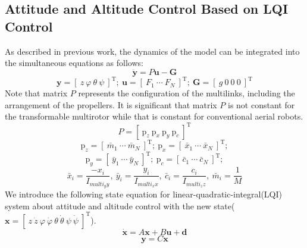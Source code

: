 \subsection{Attitude and Altitude Control Based on LQI Control}
As described in previous work\cite{Zhao2016}, the dynamics of the model can be integrated into the simultaneous equations as follows:
\begin{equation}
  \bm{\ddot{y}} = P\bm{u}-\bm{G}  
\end{equation}
\begin{equation*}
  \bm{y}=[ \ z \ \varphi \ \theta \ \psi \ ]^\mathrm{T}; \ \bm{u}=[ \ F_1 \ \cdots \ F_N \ ]^\mathrm{T}; \ \bm{G}=[ \ g \ 0 \ 0 \ 0 \ ]^\mathrm{T}
\end{equation*}
Note that matrix $P$ represents the configuration of the multilinks, including the arrangement of the propellers. It is significant that matrix $P$ is not constant for the transformable multirotor while that is constant for conventional aerial robots. 
\begin{equation}
  P = [ \ \bm{\mathrm{p}}_z \ \bm{\mathrm{p}}_x \ \bm{\mathrm{p}}_y \ \bm{\mathrm{p}}_c \ ]^\mathrm{T}
  \label{eq:P}
\end{equation}
\begin{equation*}
    \bm{\mathrm{p}}_z=[ \ \bar{m}_1 \ \cdots \ \bar{m}_N \ ]^\mathrm{T}; \ \bm{\mathrm{p}}_x=[ \ \bar{x}_1 \ \cdots \ \bar{x}_N \ ]^\mathrm{T}; 
\end{equation*}
\begin{equation*}
    \bm{\mathrm{p}}_y=[ \ \bar{y}_1 \ \cdots \ \bar{y}_N \ ]^\mathrm{T}; \ \bm{\mathrm{p}}_c=[ \ \bar{c}_1 \ \cdots \ \bar{c}_N \ ]^\mathrm{T};
\end{equation*}
\begin{equation*}
    \bar{x}_i=\frac{-x_i}{I_{multi_yy}}, \ \bar{y}_i=\frac{y_i}{I_{multi_xx}}, \ \bar{c}_i=\frac{c_i}{I_{multi_zz}}, \ \bar{m}_i=\frac{1}{M}
\end{equation*}
We introduce the following state equation for linear-quadratic-integral(LQI) system about attitude and altitude control with the new state($\bm{x}=[ \ z \ \dot{z} \ \varphi \ \dot{\varphi} \ \theta \ \dot{\theta} \ \psi \ \dot{\psi} \ ]^\mathrm{T}$).
\begin{equation}
  \dot{\bm{x}}=A\bm{x}+B\bm{u}+\bm{d}
  \label{eq:state_eq}
\end{equation}
\begin{equation}
  \bm{y}=C\bm{x}
  \label{eq:observation_eq}
\end{equation}

